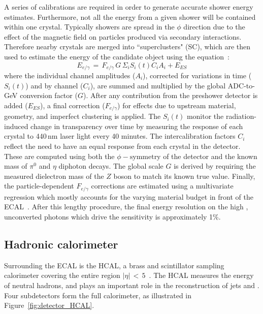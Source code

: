 A series of calibrations are required in order to generate accurate shower energy estimates.
Furthermore, not all the energy from a given shower will be contained within one crystal.
Typically showers are spread in the $\phi$ direction due to the effect of the magnetic field on particles produced via secondary interactions.
Therefore nearby crystals are merged into ``superclusters" (SC), 
which are then used to estimate the energy of the candidate object using the equation~\cite{ECALperformance}:
\begin{equation}
E_{e/\gamma}\, =\, F_{e/\gamma}\, G\, \Sigma_i S_i (t) C_i A_i + E_{ES}
\label{eq:}
\end{equation}
where the individual channel amplitudes ($A_i$), corrected for variations in time ($S_i (t)$) and by channel ($C_i$), 
are summed and multiplied by the global ADC-to-GeV conversion factor ($G$).
After any contribution from the preshower detector is added ($E_{ES}$), 
a final correction ($F_{e/\gamma}$) for effects due to upstream material, geometry, and imperfect clustering is applied. 
The $S_i (t)$ monitor the radiation-induced change in transparency over time by measuring the response of each crystal to 440\,nm laser light every 40 minutes. %
The intercalibration factors $C_i$ reflect the need to have an equal response from each crystal in the detector.
These are computed using both the $\phi-\textrm{symmetry}$ of the detector and the known mass of $\pi^{0}$ and $\eta$ diphoton decays.
The global scale $G$ is derived by requiring the measured dielectron mass of the $Z$ boson to match its known true value.
Finally, the particle-dependent $F_{e/\gamma}$ corrections are estimated using a multivariate regression which mostly accounts for the varying material budget in front of the ECAL~\cite{ECALperformance}.
After this lengthy procedure, the final energy resolution on the high \pt, unconverted photons which drive the \Hgg sensitivity is approximately 1\%.

\subsection{Hadronic calorimeter}

Surrounding the ECAL is the HCAL, a brass and scintillator sampling calorimeter covering the entire region $|\eta|\,<\,5$~\cite{CMSdetector,cmsHcal}.
The HCAL measures the energy of neutral hadrons, and plays an important role in the reconstruction of jets and \met.
Four subdetectors form the full calorimeter, as illustrated in Figure~\ref{fig:detector_HCAL}.

